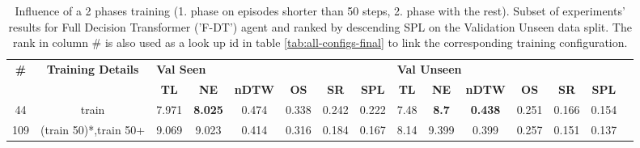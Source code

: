 \begin{table}
\centering
\caption{\label{tab:f_dt_split_training_50}Influence of a 2 phases training (1. phase on episodes shorter than 50 steps, 2. phase with the rest). Subset of experiments' results for Full Decision Transformer ('F-DT') agent and ranked by descending SPL on the Validation Unseen data split. The rank in column \# is also used as a look up id in table \ref{tab:all-configs-final} to link the corresponding training configuration.}
\begin{tabular}{@{\hskip3pt}c@{\hskip3pt}c@{\hskip3pt}c@{\hskip3pt}c@{\hskip3pt}c@{\hskip3pt}c@{\hskip3pt}c@{\hskip3pt}c@{\hskip3pt}c@{\hskip3pt}c@{\hskip3pt}c@{\hskip3pt}c@{\hskip3pt}c@{\hskip3pt}c@{\hskip3pt}c}
\toprule
\textbf{\#} & \textbf{Training Details} & \multicolumn{6}{l}{\textbf{Val Seen}} & \multicolumn{6}{l}{\textbf{Val Unseen}} \\
 \textbf{~} &                \textbf{~} &       \textbf{TL} &     \textbf{NE} & \textbf{nDTW} & \textbf{OS} & \textbf{SR} & \textbf{SPL} &         \textbf{TL} &   \textbf{NE} &   \textbf{nDTW} & \textbf{OS} & \textbf{SR} & \textbf{SPL} \\
\midrule
         44 &                     train &             7.971 &  \textbf{8.025} &         0.474 &       0.338 &       0.242 &        0.222 &                7.48 &  \textbf{8.7} &  \textbf{0.438} &       0.251 &       0.166 &        0.154 \\
        109 &     (train 50)*,train 50+ &             9.069 &           9.023 &         0.414 &       0.316 &       0.184 &        0.167 &                8.14 &         9.399 &           0.399 &       0.257 &       0.151 &        0.137 \\
\bottomrule
\end{tabular}
\end{table}
